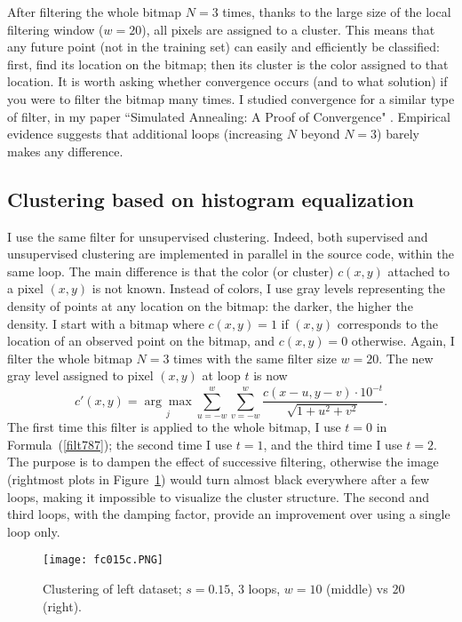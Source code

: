 \documentclass[oneside,10pt]{book}
\begin{document}
After filtering the whole bitmap $N=3$ times, thanks to the large size of the local filtering window ($w=20$), all pixels are assigned to a cluster. This means that any future point (not in the training set) can easily and efficiently be classified: first, find its location on the bitmap; then its cluster is the color assigned to that location. 
It is worth asking whether convergence occurs (and to what solution) if you were to filter the bitmap many times.  I studied convergence for a similar type of filter, in my paper 
``Simulated Annealing: A Proof of Convergence" \cite{vgieee}. Empirical evidence suggests that additional loops (increasing $N$ beyond $N=3$) barely makes any difference.  


\subsection{Clustering based on histogram equalization}\label{fc12324}


I use the same filter for unsupervised clustering.  Indeed, both supervised and unsupervised clustering are implemented in parallel in the source code, within the same loop. The main difference is that the color (or cluster) $c(x,y)$ attached to a pixel $(x,y)$ is not known. Instead of colors, I use gray levels representing the density of points at any location on the bitmap: the darker, the higher the density. I start with a bitmap where $c(x,y)=1$ if $(x,y)$ corresponds to the location of an observed point on the bitmap, and $c(x,y)=0$ otherwise. Again, I filter the whole  bitmap $N=3$ times with the same 
 filter size $w=20$. The new gray level assigned to pixel $(x,y)$ at loop $t$ is now
\begin{equation}
c'(x,y)=\underset{j}{\arg \max} \sum_{u=-w}^{w}\sum_{v=-w}^{w}\frac{c(x-u,y-v)\cdot 10^{-t}}{\sqrt{1+u^2+v^2}}. \label{filt787}
\end{equation}
The first time this filter is applied to the whole bitmap, I use $t=0$ in Formula~(\ref{filt787}); the second time I use $t=1$, and the third time I use $t=2$. The purpose is to dampen the effect of successive filtering, otherwise the image (rightmost plots in Figure~\ref{fc015c}) would turn almost black everywhere after a few loops, making it impossible to visualize the cluster structure. The second and third loops, with the damping factor, provide an improvement over using a single loop only. 

\begin{figure}[H]
\centering
\texttt{[image: fc015c.PNG]}
\caption{Clustering of left dataset; $s=0.15$, $3$ loops, $w=10$ (middle) vs $20$ (right).}
\label{fc015c} 
\end{figure}
\end{document}
